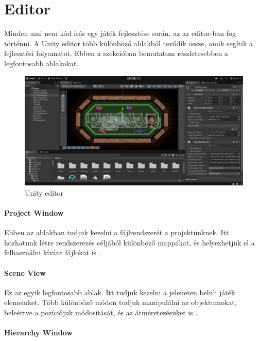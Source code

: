 \documentclass[]{thesis-ekf}
\theoremstyle{definition}
\theoremstyle{remark}
\begin{document}
\section{Editor}

\label{sec-editor}
Minden ami nem kód írás egy játék fejlesztése során, az az editor-ban fog történni. A Unity editor több különböző ablakból tevődik össze, amik segítik a fejlesztési folyamatot. Ebben a szekcióban bemutatom részletesebben a legfontosabb ablakokat.

\begin{figure}[ht!]
	\centering
	\includegraphics[width=16cm]{UnityEditor}
	\caption{Unity editor}
	\label{fig-unityeditor}
\end{figure}

\paragraph{Project Window}

Ebben az ablakban tudjuk kezelni a fájlrendszerét a projektünknek. Itt hozhatunk létre rendszerezés céljából különböző mappákat, és helyezhetjük el a felhasználni kívánt fájlokat is \cite{UnityProjectWindow}.

\paragraph{Scene View}

Ez az egyik legfontosabb ablak. Itt tudjuk kezelni a jeleneten belüli játék elemeinket. Több különböző módon tudjuk manipulálni az objektumokat, beleértve a pozíciójuk módosítását, és az átméretezésüket is \cite{UnitySceneView}.

\paragraph{Hierarchy Window}
\end{document}
